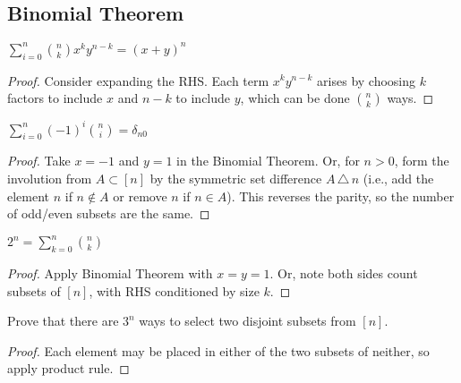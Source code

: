 \documentclass[a4paper]{article}
\begin{document}
\subsection{Binomial Theorem}

\begin{theorem}
$\displaystyle \sum_{i=0}^n\binom nkx^ky^{n-k}=(x+y)^n$

\begin{hl}
\begin{proof}
Consider expanding the RHS. Each term $x^ky^{n-k}$ arises by choosing $k$ factors to include $x$ and $n-k$ to include $y$, which can be done $\binom nk$ ways.
\end{proof}
\end{hl}
\end{theorem}

\begin{theorem}\label{alternating_binom}
$\displaystyle \sum_{i=0}^n(-1)^i\binom ni=\delta_{n0}$

\begin{hl}
\begin{proof}
Take $x=-1$ and $y=1$ in the Binomial Theorem. Or, for $n>0$, form the involution from $A\subset[n]$ by the symmetric set difference $A\,\triangle\,n$ (i.e., add the element $n$ if $n\not\in A$ or remove $n$ if $n\in A$). This reverses the parity, so the number of odd/even subsets are the same.
\end{proof}
\end{hl}
\end{theorem}

\begin{theorem}
$\displaystyle 2^n=\sum_{k=0}^n\binom nk$

\begin{hl}
\begin{proof}
Apply Binomial Theorem with $x=y=1$. Or, note both sides count subsets of $[n]$, with RHS conditioned by size $k$.
\end{proof}
\end{hl}
\end{theorem}

\begin{example}
Prove that there are $3^n$ ways to select two disjoint subsets from $[n]$.

\begin{hl}
\begin{proof}
Each element may be placed in either of the two subsets of neither, so apply product rule.
\end{proof}
\end{hl}
\end{example}
\end{document}
